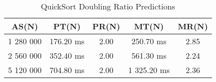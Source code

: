 \begin{table}[hp!]
    \centering
    \begin{tabular} {c | c | c | c | c}
        \textbf{AS(N)} & \textbf{PT(N)} & \textbf{PR(N)} & \textbf{MT(N)} & \textbf{MR(N)} \\
        \hline
        1 280 000 & 176.20 ms & 2.00 & 250.70 ms & 2.85 \\
        \hline
        2 560 000 & 352.40 ms & 2.00 & 561.30 ms & 2.24 \\
        \hline
        5 120 000 & 704.80 ms & 2.00 & 1 325.20 ms & 2.36 \\
    \end{tabular}
    \caption{QuickSort Doubling Ratio Predictions}
\end{table}
